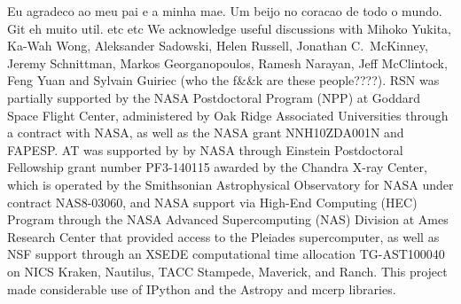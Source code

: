\documentclass[useAMS,usenatbib]{mn2e}
\begin{document}
Eu agradeco ao meu pai e a minha mae. Um beijo no coracao de todo o mundo. Git eh muito util. etc etc
We acknowledge useful discussions with Mihoko Yukita, Ka-Wah Wong, Aleksander Sadowski, Helen Russell, Jonathan C.~McKinney, Jeremy Schnittman, Markos Georganopoulos, Ramesh Narayan, Jeff McClintock, Feng Yuan and Sylvain Guiriec (who the f&&k are these people????). RSN was partially supported by the NASA Postdoctoral Program (NPP) at Goddard Space Flight Center, administered by Oak Ridge Associated Universities through a contract with NASA, as well as the NASA grant NNH10ZDA001N and FAPESP. AT was supported by by NASA through Einstein Postdoctoral Fellowship grant number PF3-140115 awarded by the Chandra X-ray Center, which is operated by the Smithsonian Astrophysical Observatory for NASA under contract NAS8-03060, and NASA support via High-End Computing (HEC) Program through the NASA Advanced Supercomputing (NAS) Division at Ames Research Center that provided access to the Pleiades supercomputer, as well as NSF support through an XSEDE computational time allocation TG-AST100040 on NICS Kraken, Nautilus, TACC Stampede, Maverick, and Ranch. This project made considerable use of IPython \citep{ipython} and the Astropy and mcerp libraries.



%




\bsp

\label{lastpage}
\end{document}
